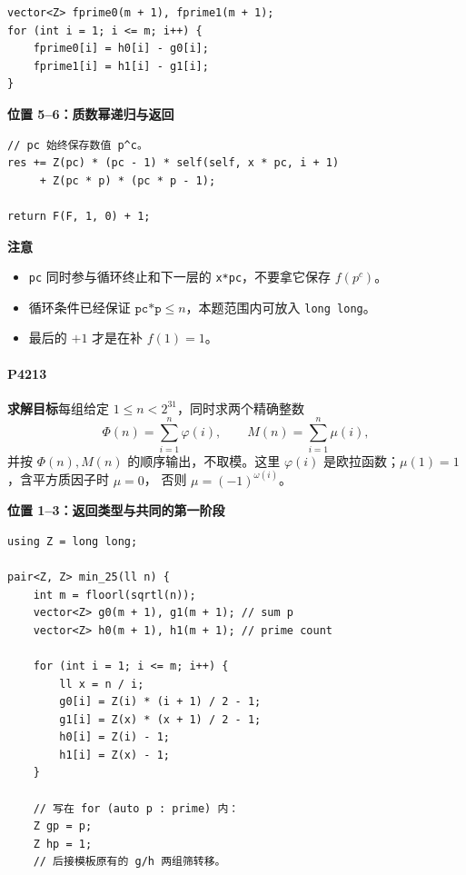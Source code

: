 \begin{verbatim}
vector<Z> fprime0(m + 1), fprime1(m + 1);
for (int i = 1; i <= m; i++) {
    fprime0[i] = h0[i] - g0[i];
    fprime1[i] = h1[i] - g1[i];
}
\end{verbatim}

\textbf{位置 5--6：质数幂递归与返回}

\begin{verbatim}
// pc 始终保存数值 p^c。
res += Z(pc) * (pc - 1) * self(self, x * pc, i + 1)
     + Z(pc * p) * (pc * p - 1);

return F(F, 1, 0) + 1;
\end{verbatim}

\textbf{注意}

\begin{itemize}
    \item \texttt{pc} 同时参与循环终止和下一层的 \texttt{x*pc}，不要拿它保存
          \(f(p^c)\)。
    \item 循环条件已经保证 \(\texttt{pc*p}\le n\)，本题范围内可放入
          \texttt{long long}。
    \item 最后的 \(+1\) 才是在补 \(f(1)=1\)。
\end{itemize}

\paragraph*{P4213}

\textbf{求解目标}\quad 每组给定 \(1\le n<2^{31}\)，同时求两个精确整数
\[
\Phi(n)=\sum_{i=1}^{n}\varphi(i),\qquad
M(n)=\sum_{i=1}^{n}\mu(i),
\]
并按 \(\Phi(n),M(n)\) 的顺序输出，不取模。这里
\(\varphi(i)\) 是欧拉函数；\(\mu(1)=1\)，含平方质因子时 \(\mu=0\)，
否则 \(\mu=(-1)^{\omega(i)}\)。

\textbf{位置 1--3：返回类型与共同的第一阶段}

\begin{verbatim}
using Z = long long;

pair<Z, Z> min_25(ll n) {
    int m = floorl(sqrtl(n));
    vector<Z> g0(m + 1), g1(m + 1); // sum p
    vector<Z> h0(m + 1), h1(m + 1); // prime count

    for (int i = 1; i <= m; i++) {
        ll x = n / i;
        g0[i] = Z(i) * (i + 1) / 2 - 1;
        g1[i] = Z(x) * (x + 1) / 2 - 1;
        h0[i] = Z(i) - 1;
        h1[i] = Z(x) - 1;
    }

    // 写在 for (auto p : prime) 内：
    Z gp = p;
    Z hp = 1;
    // 后接模板原有的 g/h 两组筛转移。
\end{verbatim}


